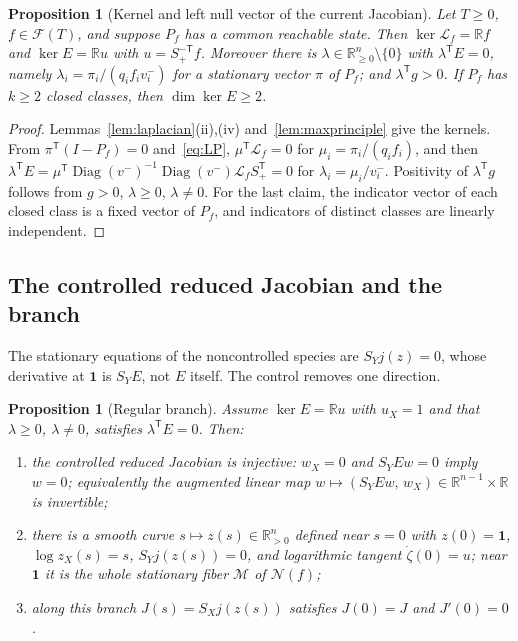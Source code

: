 \documentclass[11pt,reqno]{amsart}
\theoremstyle{plain}
\newtheorem{proposition}[theorem]{Proposition}
\theoremstyle{definition}
\theoremstyle{remark}
\numberwithin{equation}{section}
\newcommand{\R}{\mathbb{R}}
\newcommand{\one}{\mathbf{1}}
\newcommand{\Diag}{\operatorname{Diag}}
\newcommand{\Ker}{\operatorname{ker}}
\newcommand{\Sp}{S_{+}}
\newcommand{\T}{\mathsf{T}}
\newcommand{\cone}{\mathcal{F}}
\begin{document}
\begin{proposition}[Kernel and left null vector of the current Jacobian]\label{prop:kernel}
Let $T\ge0$, $f\in\cone(T)$, and suppose $P_f$ has a common reachable state.  Then $\Ker\mathcal L_f=\R f$ and $\Ker E=\R u$ with $u=\Sp^{-\T}f$.  Moreover there is $\lambda\in\R^n_{\ge0}\setminus\{0\}$ with $\lambda^{\T}E=0$, namely $\lambda_i=\pi_i/(q_if_iv^-_i)$ for a stationary vector $\pi$ of $P_f$; and $\lambda^{\T}g>0$.  If $P_f$ has $k\ge2$ closed classes, then $\dim\Ker E\ge2$.
\end{proposition}

\begin{proof}
Lemmas~\ref{lem:laplacian}(ii),(iv) and~\ref{lem:maxprinciple} give the kernels.  From $\pi^{\T}(I-P_f)=0$ and~\eqref{eq:LP}, $\mu^{\T}\mathcal L_f=0$ for $\mu_i=\pi_i/(q_if_i)$, and then $\lambda^{\T}E=\mu^{\T}\Diag(v^-)^{-1}\Diag(v^-)\mathcal L_f\Sp^{\T}=0$ for $\lambda_i=\mu_i/v^-_i$.  Positivity of $\lambda^{\T}g$ follows from $g>0$, $\lambda\ge0$, $\lambda\ne0$.  For the last claim, the indicator vector of each closed class is a fixed vector of $P_f$, and indicators of distinct classes are linearly independent.
\end{proof}

\subsection{The controlled reduced Jacobian and the branch}
The stationary equations of the noncontrolled species are $S_Yj(z)=0$, whose derivative at $\one$ is $S_YE$, not $E$ itself.  The control removes one direction.

\begin{proposition}[Regular branch]\label{prop:branch}
Assume $\Ker E=\R u$ with $u_X=1$ and that $\lambda\ge0$, $\lambda\ne0$, satisfies $\lambda^{\T}E=0$.  Then:
\begin{enumerate}[label=(\roman*)]
\item the controlled reduced Jacobian is injective: $w_X=0$ and $S_YEw=0$ imply $w=0$; equivalently the augmented linear map $w\mapsto(S_YEw,\,w_X)\in\R^{n-1}\times\R$ is invertible;
\item there is a smooth curve $s\mapsto z(s)\in\R^n_{>0}$ defined near $s=0$ with $z(0)=\one$, $\log z_X(s)=s$, $S_Yj(z(s))=0$, and logarithmic tangent $\dot\zeta(0)=u$; near $\one$ it is the whole stationary fiber $\mathcal M$ of $\mathcal N(f)$;
\item along this branch $J(s)=S_Xj(z(s))$ satisfies $J(0)=J$ and $J'(0)=0$.
\end{enumerate}
\end{proposition}
\end{document}
